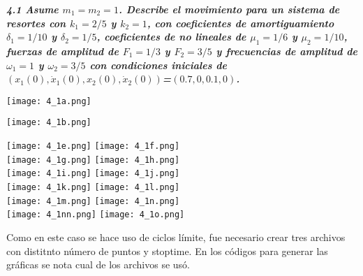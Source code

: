 \documentclass[12pt]{article}
\begin{document}
\textbf{\textit{4.1 Asume $m_1 = m_2 = 1$. Describe el movimiento para un sistema de resortes con $k_1=2/5$ y $k_2=1$, con coeficientes de amortiguamiento $\delta_1=1/10$ y $\delta_2=1/5$, coeficientes de no lineales de $\mu_1=1/6$ y $\mu_2=1/10$, fuerzas de amplitud de $F_1=1/3$ y $F_2=3/5$ y frecuencias de amplitud de $\omega_1=1$ y $\omega_2=3/5$ con condiciones iniciales de $(x_1(0), \dot x_1(0), x_2(0), \dot x_2(0))$=$(0.7,0,0.1,0)$.}\\}
\begin{center}
    \texttt{[image: 4\_1a.png]}\\
\end{center}
\begin{center}
    \texttt{[image: 4\_1b.png]}
\end{center}
\begin{center}
    \texttt{[image: 4\_1e.png]}\hspace*{\fill}
    \texttt{[image: 4\_1f.png]}\\
    \texttt{[image: 4\_1g.png]}\hspace*{\fill}
    \texttt{[image: 4\_1h.png]}\\
    \texttt{[image: 4\_1i.png]}\hspace*{\fill}
    \texttt{[image: 4\_1j.png]}\\
    \texttt{[image: 4\_1k.png]}\hspace*{\fill}
    \texttt{[image: 4\_1l.png]}\\
    \texttt{[image: 4\_1m.png]}\hspace*{\fill}
    \texttt{[image: 4\_1n.png]}\\
    \texttt{[image: 4\_1nn.png]}\hspace*{\fill}
    \texttt{[image: 4\_1o.png]}\\
\end{center}
Como en este caso se hace uso de ciclos límite, fue necesario crear tres archivos con distitnto número de puntos y stoptime. En los códigos para generar las gráficas se nota cual de los archivos se usó.
\newpage
\end{document}
